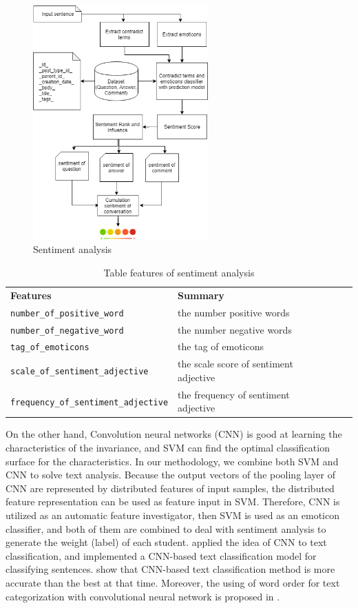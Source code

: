 \documentclass[letterpaper%
, twoside%
, 12pt%
,these%
, english%
,creativecommons,hyperref, withAlgo2e %
]{thETS}
\newcommand{\code}[1]{{\texttt{#1}}}
\begin{document}
\begin{figure}
	\includegraphics[width=0.6\textwidth]{Figures/st5.png}
	\caption{Sentiment analysis}
	\label{sentiment}
\end{figure}
\begin{table}[]
	\begin{tabular}{|l|l|lll}
		\cline{1-2}
		\textbf{Features}             & \textbf{Summary}              &  &  &  \\ \cline{1-2}
		\code{number\_of\_positive\_word}  & the number positive words  &  &  &  \\ \cline{1-2}
		\code{number\_of\_negative\_word}  & the number negative words  &  &  &  \\ \cline{1-2}
		\code{tag\_of\_emoticons}  & the tag of emoticons  &  &  &  \\ \cline{1-2}
		\code{scale\_of\_sentiment\_adjective}  & the scale score of sentiment adjective  &  &  &  \\ \cline{1-2}
		\code{frequency\_of\_sentiment\_adjective}  & the frequency  of sentiment adjective  &  &  &  \\ \cline{1-2}
	\end{tabular}
	\caption{Table features of sentiment analysis}
	\label{tab:svm}
\end{table}
On the other hand, Convolution neural networks (CNN) is good at learning the characteristics of the invariance, and SVM can find the optimal classification surface for the characteristics. In our methodology, we combine both SVM and CNN to solve text analysis. Because the output vectors of the pooling layer of CNN are represented by distributed features of input samples, the distributed feature representation can be used as feature input in SVM. Therefore, CNN is utilized as an automatic feature investigator, then SVM is used as an emoticon classifier, and both of them are combined to deal with sentiment analysis to generate the weight (label) of each student. \cite{Kim} applied the idea of CNN to text classification, and implemented a CNN-based text classification model for classifying sentences. show that CNN-based text classification method is more accurate than the best at that time.  Moreover, the using of word order for text categorization with convolutional neural network is proposed in \cite{Johnson}. 
\end{document}
